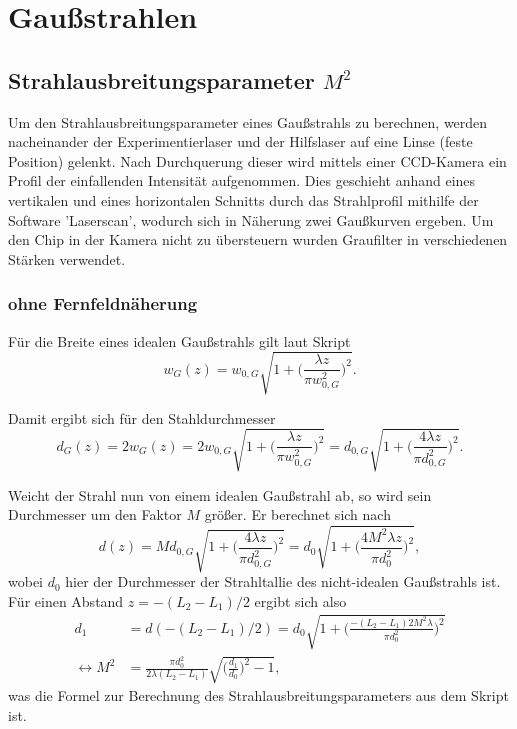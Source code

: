 
\section{Gaußstrahlen}
\label{sec:gauss}

\subsection{Strahlausbreitungsparameter $M^2$}
Um den Strahlausbreitungsparameter eines Gaußstrahls zu berechnen, werden nacheinander der Experimentierlaser und der Hilfslaser auf eine Linse (feste Position) gelenkt. Nach 
Durchquerung dieser wird mittels einer CCD-Kamera ein Profil der einfallenden Intensität aufgenommen. Dies geschieht anhand eines vertikalen und eines horizontalen Schnitts 
durch das Strahlprofil mithilfe der Software 'Laserscan', wodurch sich in Näherung zwei Gaußkurven ergeben. Um den Chip in der Kamera nicht zu übersteuern wurden Graufilter in verschiedenen Stärken verwendet.

\subsubsection*{ohne Fernfeldnäherung}

Für die Breite eines idealen Gaußstrahls gilt laut Skript 
\begin{equation*}
    w_G(z) = w_{0,G} \sqrt{1 + \biggl(\frac{\lambda z}{\pi w_{0,G}^2}\biggl)^2}.
\end{equation*}

Damit ergibt sich für den Stahldurchmesser 
\begin{equation*}
    d_G(z) = 2 w_G(z) = 2 w_{0,G} \sqrt{1 + \biggl(\frac{\lambda z}{\pi w_{0,G}^2}\biggl)^2} = d_{0,G} \sqrt{1 + \biggl(\frac{4\lambda z}{\pi d_{0,G}^2}\biggl)^2}.
\end{equation*}

Weicht der Strahl nun von einem idealen Gaußstrahl ab, so wird sein Durchmesser um den Faktor $M$ größer. Er berechnet sich nach
\begin{equation*}
    d(z) = M d_{0,G} \sqrt{1 + \biggl(\frac{4\lambda z}{\pi d_{0,G}^2}\biggl)^2} = d_0 \sqrt{1 +\biggl (\frac{4M^2\lambda z}{\pi d_0^2}\biggl)^2},
\end{equation*}
wobei $d_0$ hier der Durchmesser der Strahltallie des nicht-idealen Gaußstrahls ist.
Für einen Abstand $z = -(L_2-L_1)/2$ ergibt sich also
\begin{align}
    d_1 &= d(-(L_2-L_1)/2) = d_0 \sqrt{1 +\biggl (\frac{-(L_2-L_1)2M^2\lambda}{\pi d_0^2}\biggl)^2} \nonumber \\
    \leftrightarrow M^2 &= \frac{\pi d_0^2}{2 \lambda (L_2-L_1) } \sqrt{\biggl(\frac{d_1}{d_0}\biggl)^2-1},
    \label{eq:M}
\end{align}
was die Formel zur Berechnung des Strahlausbreitungsparameters aus dem Skript ist.

